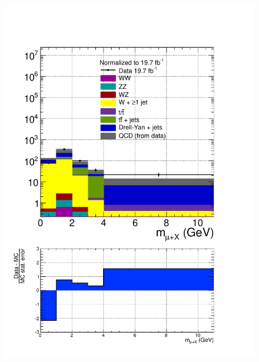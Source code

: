 \begin{figure}[hbtp]
  \begin{center}
    \includegraphics[width=\cmsFigWidth]{figures/dataVsMCQCD_muHadMass_lowMT_v87}

\end{center}
\end{figure}

